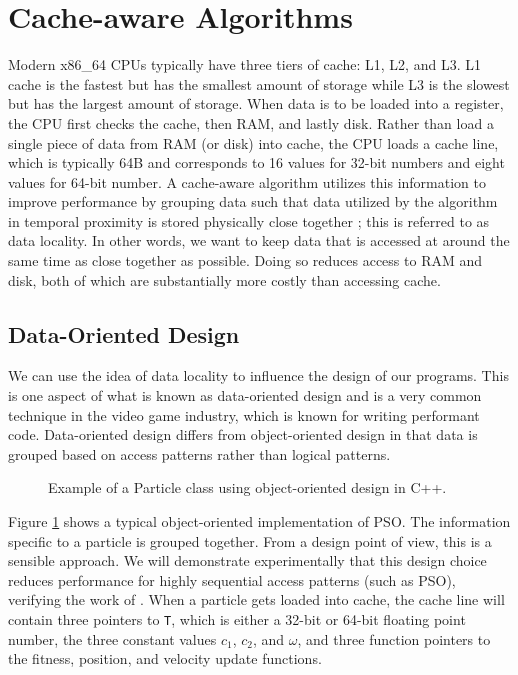 \section{Cache-aware Algorithms}\label{sec:cache}
Modern x86\_64 CPUs typically have three tiers of cache: L1, L2, and
L3. L1 cache is the fastest but has the smallest amount of storage while L3 is the
slowest but has the largest amount of storage.
When data is to be loaded into a register, the CPU first checks the
cache, then RAM, and lastly disk. Rather than load a single piece of data from
RAM (or disk) into cache, the CPU loads a cache line, which is typically
64B and corresponds to 16 values for 32-bit
numbers  and eight values for 64-bit number.
A cache-aware
algorithm utilizes this information to improve performance by grouping data such that data utilized by
the algorithm in temporal proximity is stored physically close together \cite{scientific-software}; this
is referred to as data locality. In other words, we want to keep data that is
accessed at around the same time as close together as possible. Doing so reduces
access to RAM and disk, both of which are substantially more
costly than accessing cache.

\subsection{Data-Oriented Design}
We can use the idea of data locality to
influence the design of our programs. This is one aspect of what is known as
data-oriented design\cite{dod} and
is a very common technique in the video game industry, which is known for
writing performant code.
Data-oriented design
differs from object-oriented design in that data is grouped based on access
patterns rather than logical patterns.

\begin{figure}
  
  \caption{Example of a Particle class using object-oriented
    design in C++.}\label{fig:particle}
\end{figure}

Figure \ref{fig:particle} shows a typical object-oriented implementation of PSO.
The information specific to a particle is grouped together. From a
design point of view, this is a sensible approach. We will demonstrate
experimentally that this design choice reduces performance
for highly sequential access patterns (such as PSO), verifying the work
of \cite{cache-pso}.
When a particle gets loaded into cache, the
cache line will contain three pointers to \texttt{T}, which is either a
32-bit or 64-bit floating point number, the three constant values
$c_1$, $c_2$, and $\omega$, and three function pointers to the fitness,
position, and velocity update functions.

